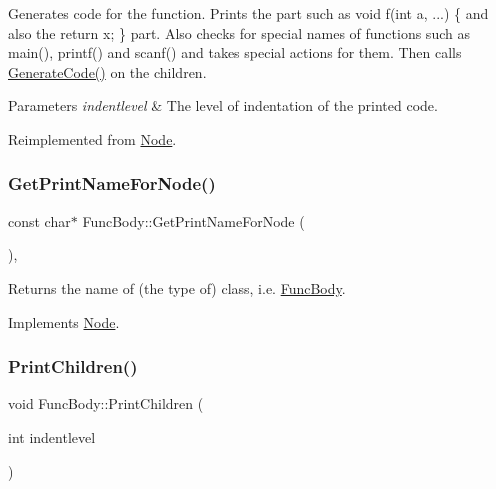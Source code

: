 Generates code for the function. Prints the part such as void f(int a, ...) \{ and also the return x; \} part. Also checks for special names of functions such as main(), printf() and scanf() and takes special actions for them. Then calls \hyperlink{class_func_body_ade15e61124358e79682a8a78dd92f064}{Generate\+Code()} on the children. 
\begin{DoxyParams}{Parameters}
{\em indentlevel} & The level of indentation of the printed code. \\
\hline
\end{DoxyParams}


Reimplemented from \hyperlink{class_node_acb60e526730e8436056375a3055c2c32}{Node}.

\mbox{\label{class_func_body_ae2e7c93a201a73256289ecbb59455961}} 
\subsubsection{\texorpdfstring{Get\+Print\+Name\+For\+Node()}{GetPrintNameForNode()}}
{\footnotesize\ttfamily const char$\ast$ Func\+Body\+::\+Get\+Print\+Name\+For\+Node (\begin{DoxyParamCaption}{ }\end{DoxyParamCaption})\hspace{0.3cm}{\ttfamily [inline]}, {\ttfamily [virtual]}}

Returns the name of (the type of) class, i.\+e. \hyperlink{class_func_body}{Func\+Body}. 

Implements \hyperlink{class_node_a56e29657306ffb004d69c6929ae44269}{Node}.

\mbox{\label{class_func_body_a6e42023a04da72f19901550f910b2e35}} 
\subsubsection{\texorpdfstring{Print\+Children()}{PrintChildren()}}
{\footnotesize\ttfamily void Func\+Body\+::\+Print\+Children (\begin{DoxyParamCaption}\item[{int}]{indentlevel }\end{DoxyParamCaption})\hspace{0.3cm}{\ttfamily [virtual]}}

